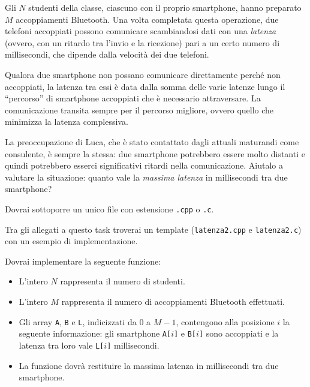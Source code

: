 Gli $N$ studenti della classe, ciascuno con il proprio smartphone, hanno preparato $M$ accoppiamenti Bluetooth. Una volta completata questa operazione, due telefoni accoppiati possono comunicare scambiandosi dati con una \emph{latenza} (ovvero, con un ritardo tra l'invio e la ricezione) pari a un certo numero di millisecondi, che dipende dalla velocità dei due telefoni.

Qualora due smartphone non possano comunicare direttamente perché non accoppiati, la latenza tra essi è data dalla somma delle varie latenze lungo il ``percorso'' di smartphone accoppiati che è necessario attraversare. La comunicazione transita sempre per il percorso migliore, ovvero quello che minimizza la latenza complessiva. 

La preoccupazione di Luca, che è stato contattato dagli attuali maturandi come consulente, è sempre la stessa: due smartphone potrebbero essere molto distanti e quindi potrebbero esserci significativi ritardi nella comunicazione. Aiutalo a valutare la situazione: quanto vale la \emph{massima latenza} in millisecondi tra due smartphone?

\Implementation

Dovrai sottoporre un unico file con estensione \texttt{.cpp} o \texttt{.c}.

\begin{warning}
Tra gli allegati a questo task troverai un template (\texttt{latenza2.cpp} e \texttt{latenza2.c}) con un esempio di implementazione.
\end{warning}

Dovrai implementare la seguente funzione:

\begin{itemize}[nolistsep]

    \begin{itemize}[nolistsep]
        \item L'intero $N$ rappresenta il numero di studenti.
        \item L'intero $M$ rappresenta il numero di accoppiamenti Bluetooth effettuati.
        \item Gli array \texttt{A}, \texttt{B} e \texttt{L}, indicizzati da $0$ a $M-1$, contengono alla posizione $i$ la seguente informazione: gli smartphone \texttt{A[$i$]} e \texttt{B[$i$]} sono accoppiati e la latenza tra loro vale \texttt{L[$i$]} millisecondi.
        \item La funzione dovrà restituire la massima latenza in millisecondi tra due smartphone.

    \end{itemize}
\end{itemize}


